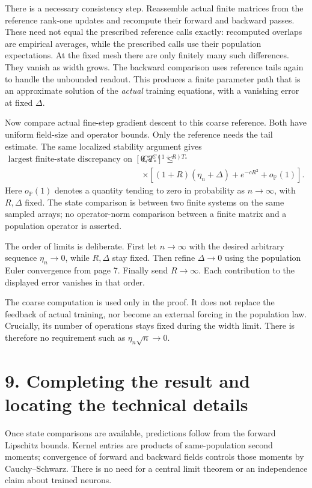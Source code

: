 There is a necessary consistency step. Reassemble actual finite matrices
from the reference rank-one updates and recompute their forward and backward
passes. These need not equal the prescribed reference calls exactly:
recomputed overlaps are empirical averages, while the prescribed calls use
their population expectations. At the fixed mesh there are only finitely
many such differences. They vanish as width grows. The backward comparison
uses reference tails again to handle the unbounded readout. This produces
a finite parameter path that is an approximate solution of the \emph{actual}
training equations, with a vanishing error at fixed $\Delta$.

Now compare actual fine-step gradient descent to this coarse reference.
Both have uniform field-size and operator bounds. Only the reference needs
the tail estimate. The same localized stability argument gives
\[
\begin{split}
\text{largest finite-state discrepancy on }[0,T_*]
\ \le\ & C e^{C(1+R)T_*}\\[-3pt]
&\times\left[(1+R)(\eta_n+\Delta)+e^{-cR^2}
                 +o_{\mathbb P}(1)\right].
\end{split}
\]
Here $o_{\mathbb P}(1)$ denotes a quantity tending to zero in probability
as $n\to\infty$, with $R,\Delta$ fixed. The state comparison is between
two finite systems on the same sampled arrays; no operator-norm comparison
between a finite matrix and a population operator is asserted.

The order of limits is deliberate. First let $n\to\infty$ with the desired arbitrary sequence $\eta_n\to0$,
while $R,\Delta$ stay fixed. Then refine $\Delta\to0$ using the population
Euler convergence from page 7. Finally send $R\to\infty$. Each contribution
to the displayed error vanishes in that order.

The coarse computation is used only in the proof. It does not replace the
feedback of actual training, nor become an external forcing in the population
law. Crucially, its number of operations stays fixed during the width limit.
There is therefore no requirement such as $\eta_n\sqrt n\to0$.

\newpage
\section*{9. Completing the result and locating the technical details}

Once state comparisons are available, predictions follow from the forward
Lipschitz bounds. Kernel entries are products of same-population second
moments; convergence of forward and backward fields controls those moments
by Cauchy--Schwarz. There is no need for a central limit theorem or an
independence claim about trained neurons.

